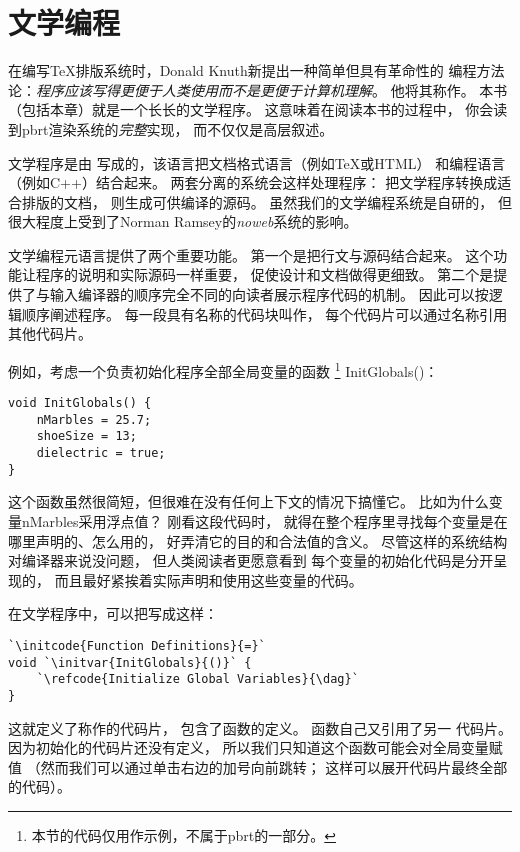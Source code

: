 \section{文学编程}\label{sec:文学编程}

在编写\TeX 排版系统时，Donald Knuth新提出一种简单但具有革命性的
编程方法论：\emph{程序应该写得更便于人类使用而不是更便于计算机理解}。
他将其称作。
本书（包括本章）就是一个长长的文学程序。
这意味着在阅读本书的过程中，
你会读到pbrt渲染系统的\emph{完整}实现，
而不仅仅是高层叙述。

文学程序是由
写成的，该语言把文档格式语言（例如\TeX 或HTML）
和编程语言（例如C++）结合起来。
两套分离的系统会这样处理程序：
把文学程序转换成适合排版的文档，
则生成可供编译的源码。
虽然我们的文学编程系统是自研的，
但很大程度上受到了Norman Ramsey的\emph{noweb}系统的影响。

文学编程元语言提供了两个重要功能。
第一个是把行文与源码结合起来。
这个功能让程序的说明和实际源码一样重要，
促使设计和文档做得更细致。
第二个是提供了与输入编译器的顺序完全不同的向读者展示程序代码的机制。
因此可以按逻辑顺序阐述程序。
每一段具有名称的代码块叫作，
每个代码片可以通过名称引用其他代码片。

例如，考虑一个负责初始化程序全部全局变量的函数
\footnote{本节的代码仅用作示例，不属于pbrt的一部分。}
{\ttfamily InitGlobals()}：
\begin{lstlisting}
void InitGlobals() {
    nMarbles = 25.7;
    shoeSize = 13;
    dielectric = true;
}
\end{lstlisting}

这个函数虽然很简短，但很难在没有任何上下文的情况下搞懂它。
比如为什么变量{\ttfamily nMarbles}采用浮点值？
刚看这段代码时，
就得在整个程序里寻找每个变量是在哪里声明的、怎么用的，
好弄清它的目的和合法值的含义。
尽管这样的系统结构对编译器来说没问题，
但人类阅读者更愿意看到
每个变量的初始化代码是分开呈现的，
而且最好紧挨着实际声明和使用这些变量的代码。

在文学程序中，可以把写成这样：
\begin{lstlisting}
`\initcode{Function Definitions}{=}`
void `\initvar{InitGlobals}{()}` {
    `\refcode{Initialize Global Variables}{\dag}`
}
\end{lstlisting}

这就定义了称作的代码片，
包含了函数的定义。
函数自己又引用了另一
代码片。
因为初始化的代码片还没有定义，
所以我们只知道这个函数可能会对全局变量赋值
（然而我们可以通过单击右边的加号向前跳转；
这样可以展开代码片最终全部的代码）。

